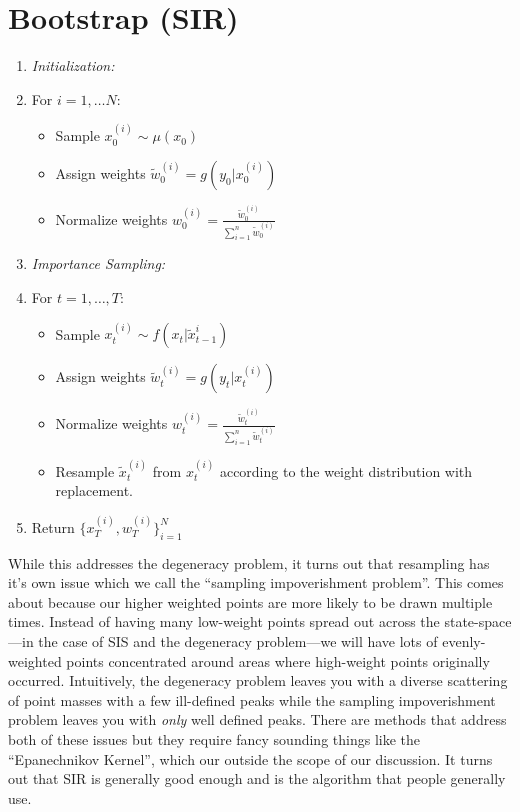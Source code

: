 \documentclass{article}
\begin{document}
\section{Bootstrap (SIR)}
\begin{enumerate}
\item \textit{Initialization:}
\item[] For $i=1,\dots N$:
\begin{itemize}
\item[] Sample $x_0^{(i)} \sim \mu(x_0)$
\item[] Assign weights $\widetilde{w}_0^{(i)} = g(y_0|x_0^{(i)})$
\item[] Normalize weights $w_0^{(i)} = \frac{\widetilde{w}_0^{(i)}}{\sum_{i=1}^{n} \widetilde{w}_0^{(i)}}$
\end{itemize}
\item \textit{Importance Sampling:}
\item[] For $t=1,\dots,T$:
\begin{itemize}
\item[] Sample $x_t^{(i)} \sim f(x_t|\widetilde{x}_{t-1}^{i})$
\item[] Assign weights $\widetilde{w}_t^{(i)} = g(y_t|x_t^{(i)})$
\item[] Normalize weights $w_t^{(i)} = \frac{\widetilde{w}_t^{(i)}}{\sum_{i=1}^{n} \widetilde{w}_t^{(i)}}$
\item[] Resample $\widetilde{x}_t^{(i)}$ from $x_t^{(i)}$ according to the weight distribution with replacement.
\end{itemize}
\item Return $\{x_T^{(i)},w_T^{(i)}\}_{i=1}^N$
\end{enumerate}

While this addresses the degeneracy problem, it turns out that resampling has it's own issue which we call the ``sampling impoverishment problem''. This comes about because our higher weighted points are more likely to be drawn multiple times. Instead of having many low-weight points spread out across the state-space---in the case of SIS and the degeneracy problem---we will have lots of evenly-weighted points concentrated around areas where high-weight points originally occurred. Intuitively, the degeneracy problem leaves you with a diverse scattering of point masses with a few ill-defined peaks while the sampling impoverishment problem leaves you with \textit{only} well defined peaks. There are methods that address both of these issues but they require fancy sounding things like the ``Epanechnikov Kernel'', which our outside the scope of our discussion. It turns out that SIR is generally good enough and is the algorithm that people generally use.
\end{document}

